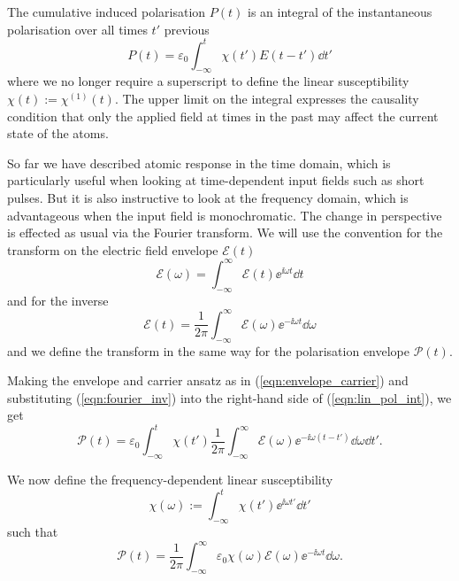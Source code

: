     The cumulative induced polarisation $P(t)$ is an integral of the
    instantaneous polarisation over all times $t'$ previous
    \begin{equation}\label{eqn:lin_pol_int}
      P(t) = \varepsilon_0 \int_{-\infty}^t{\chi(t') E(t - t') \dd t'}
    \end{equation}
    where we no longer require a superscript to define the linear susceptibility
    $\chi(t) := \chi^{(1)}(t)$. The upper limit on the integral expresses the
    causality condition that only the applied field at times in the past may
    affect the current state of the atoms.

    So far we have described atomic response in the time domain, which is
    particularly useful when looking at time-dependent input fields such as
    short pulses. But it is also instructive to look at the frequency domain,
    which is advantageous when the input field is monochromatic. The change in
    perspective is effected as usual via the Fourier
    transform.\cite{hecht2015optics} We will use the convention for the
    transform on the electric field envelope
    $\mathcal{E}(t)$
    \begin{equation}\label{eqn:fourier_transform}
      \mathcal{E}(\omega) = \int_{-\infty}^{\infty} \mathcal{E}(t) 
                              \ee^{\ii \omega t}  \dd t
    \end{equation}
    and for the inverse
    \begin{equation}\label{eqn:fourier_inv}
      \mathcal{E}(t) = \frac{1}{2\pi}\int_{-\infty}^{\infty} \mathcal{E}(\omega) 
                          \ee^{-\ii \omega t} \dd \omega
    \end{equation} 
    and we define the transform in the same way for the polarisation envelope
    $\mathcal{P}(t)$.

    Making the envelope and carrier ansatz as in (\ref{eqn:envelope_carrier})
    and substituting (\ref{eqn:fourier_inv}) into the right-hand side of
    (\ref{eqn:lin_pol_int}), we get
    \begin{equation}
      \mathcal{P}(t) = \varepsilon_0 \int_{-\infty}^{t} \chi(t') \frac{1}{2 \pi} 
      \int_{-\infty}^{\infty} \mathcal{E}(\omega) \ee^{-\ii \omega (t - t')} 
      \dd \omega \dd t'.
    \end{equation}

    We now define the frequency-dependent linear susceptibility 
    \begin{equation}
       \chi(\omega) := \int_{-\infty}^{t} \chi(t') \ee^{\ii \omega t'} \dd t'
    \end{equation}  
    such that
    \begin{equation}
      \mathcal{P}(t) = \frac{1}{2\pi} \int_{-\infty}^{\infty} \varepsilon_0 
      \chi(\omega) \mathcal{E}(\omega) \ee^{-\ii \omega t} \dd \omega.
    \end{equation}


